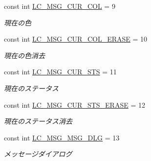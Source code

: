 \begin{DoxyCompactItemize}
\mbox{\label{class_reversi_form_1_1_reversi_const_af3a7af4be07aba241f10512e0705e1a7}} 
const int \hyperlink{class_reversi_form_1_1_reversi_const_af3a7af4be07aba241f10512e0705e1a7}{L\+C\+\_\+\+M\+S\+G\+\_\+\+C\+U\+R\+\_\+\+C\+OL} = 9
\begin{DoxyCompactList}\small\item\em 現在の色 \end{DoxyCompactList}\item 
\mbox{\label{class_reversi_form_1_1_reversi_const_a5c979b0a3463fca6376a6be6430883ef}} 
const int \hyperlink{class_reversi_form_1_1_reversi_const_a5c979b0a3463fca6376a6be6430883ef}{L\+C\+\_\+\+M\+S\+G\+\_\+\+C\+U\+R\+\_\+\+C\+O\+L\+\_\+\+E\+R\+A\+SE} = 10
\begin{DoxyCompactList}\small\item\em 現在の色消去 \end{DoxyCompactList}\item 
\mbox{\label{class_reversi_form_1_1_reversi_const_a2d5f4f080a281d616e1bf3bceb880133}} 
const int \hyperlink{class_reversi_form_1_1_reversi_const_a2d5f4f080a281d616e1bf3bceb880133}{L\+C\+\_\+\+M\+S\+G\+\_\+\+C\+U\+R\+\_\+\+S\+TS} = 11
\begin{DoxyCompactList}\small\item\em 現在のステータス \end{DoxyCompactList}\item 
\mbox{\label{class_reversi_form_1_1_reversi_const_a30629f33f72a17186349f7712b74b540}} 
const int \hyperlink{class_reversi_form_1_1_reversi_const_a30629f33f72a17186349f7712b74b540}{L\+C\+\_\+\+M\+S\+G\+\_\+\+C\+U\+R\+\_\+\+S\+T\+S\+\_\+\+E\+R\+A\+SE} = 12
\begin{DoxyCompactList}\small\item\em 現在のステータス消去 \end{DoxyCompactList}\item 
\mbox{\label{class_reversi_form_1_1_reversi_const_afcb21d67ed2e163d38d51d4235190a0c}} 
const int \hyperlink{class_reversi_form_1_1_reversi_const_afcb21d67ed2e163d38d51d4235190a0c}{L\+C\+\_\+\+M\+S\+G\+\_\+\+M\+S\+G\+\_\+\+D\+LG} = 13
\begin{DoxyCompactList}\small\item\em メッセージダイアログ \end{DoxyCompactList}\item 

\end{DoxyCompactItemize}
